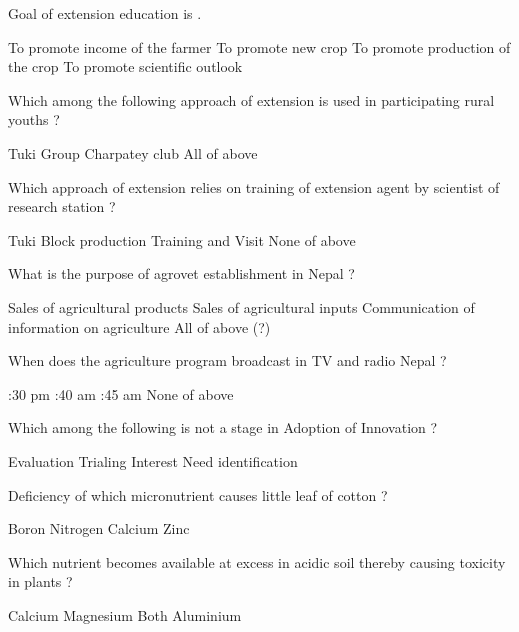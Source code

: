 \begin{questions}
\question Goal of extension education is \fillin[][3cm].
\begin{choices}
\choice To promote income of the farmer
\choice To promote new crop
\choice To promote production of the crop
\CorrectChoice To promote scientific outlook
\end{choices}

\question Which among the following approach of extension is used in participating rural youths ?
\begin{choices}
\choice Tuki
\choice Group
\CorrectChoice Charpatey club
\choice All of above
\end{choices}

\question Which approach of extension relies on training of extension agent by scientist of research station ?
\begin{choices}
\choice Tuki
\choice Block production
\CorrectChoice Training and Visit
\choice None of above
\end{choices}

\question What is the purpose of agrovet establishment in Nepal ?
\begin{choices}
\choice Sales of agricultural products
\choice Sales of agricultural inputs
\choice Communication of information on agriculture
\CorrectChoice All of above (?)
\end{choices}

\question When does the agriculture program broadcast in TV and radio Nepal ?
\begin{choices}
:30 pm
:40 am
:45 am
\CorrectChoice None of above
\end{choices}

\question Which among the following is not a stage in Adoption of Innovation ?
\begin{choices}
\choice Evaluation
\choice Trialing
\choice Interest
\CorrectChoice Need identification
\end{choices}

\question Deficiency of which micronutrient causes little leaf of cotton ?
\begin{choices}
\choice Boron
\choice Nitrogen
\choice Calcium
\CorrectChoice Zinc
\end{choices}

\question Which nutrient becomes available at excess in acidic soil thereby causing toxicity in plants ?
\begin{choices}
\choice Calcium
\choice Magnesium
\choice Both
\CorrectChoice Aluminium
\end{choices}


\end{questions}
